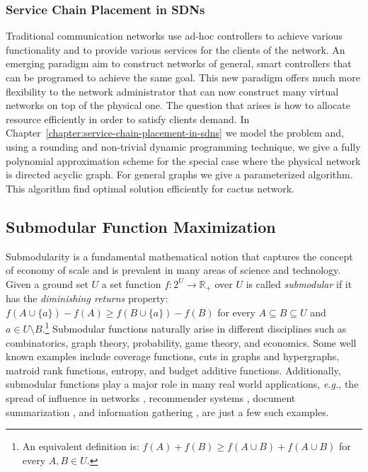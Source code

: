 \subsubsection*{Service Chain Placement in SDNs} 
Traditional communication networks use ad-hoc controllers to achieve various functionality and to provide various services for the clients of the network.
An emerging paradigm aim to construct networks of general, smart controllers that can be programed to achieve the same goal. 
This new paradigm offers much more flexibility to the network administrator that can now construct many virtual networks on top of the physical one.
The question that arises is how to allocate resource efficiently in order to satisfy clients demand.
In Chapter~\ref{chapter:service-chain-placement-in-sdns} we model the problem and, using a rounding and non-trivial dynamic programming technique, we give a fully polynomial approximation scheme for the special case where the physical network is directed acyclic graph. 
For general graphs we give a parameterized algorithm.
This algorithm find optimal solution efficiently for cactus network.

\subsection*{Submodular Function Maximization}
Submodularity is a fundamental mathematical notion that captures the concept of economy of scale and is prevalent in many areas of science and technology.
Given a ground set $U$ a set function $f:2^U \to \mathbb{R}_+$ over $U$ is called \emph{submodular} if it has the \emph{diminishing returns} property:
$f(A \cup \{a\}) - f(A) \geq f(B \cup \{a\}) - f(B)$ for every $A \subseteq B \subseteq U$ and $a \in U \setminus B$.\footnote{
    An equivalent definition is: $f(A) + f(B) \geq f(A \cup B) + f(A \cup B)$ for every $A,B \in U$.
}
Submodular functions naturally arise in different disciplines such as combinatorics, graph theory, probability, game theory, and economics.
Some well known examples include coverage functions, cuts in graphs and hypergraphs, matroid rank functions, entropy, and budget additive functions.
Additionally, submodular functions play a major role in many real world applications, {\em e.g.}, the spread of influence in networks \cite{KKT03,KKT05,KKT15,MR10}, recommender systems \cite{EG11,EVSG09}, document summarization \cite{DKR13,LB10,LB11}, and information gathering \cite{GKS05,KG11,KGGK06,KGGK11,KSG08}, are just a few such examples.

